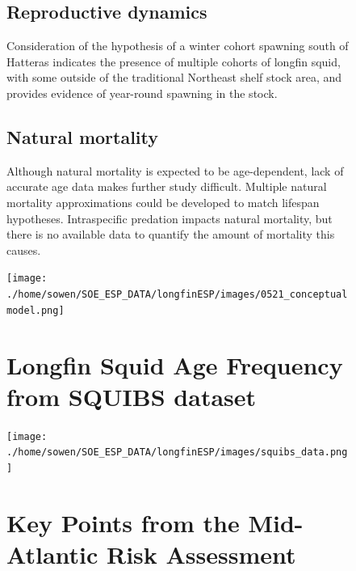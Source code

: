 \documentclass[
  8.5pt,
  letterpaper,
]{article}
\begin{document}
\begin{figure}
\begin{minipage}{0.57\linewidth}
\vspace{0.25cm}

\subsection{Reproductive dynamics}

Consideration of the hypothesis of a winter cohort spawning south of
Hatteras indicates the presence of multiple cohorts of longfin squid,
with some outside of the traditional Northeast shelf stock area, and
provides evidence of year-round spawning in the stock.

\vspace{0.25cm}

\subsection{Natural mortality}

Although natural mortality is expected to be age-dependent, lack of
accurate age data makes further study difficult. Multiple natural
mortality approximations could be developed to match lifespan
hypotheses. Intraspecific predation impacts natural mortality, but there
is no available data to quantify the amount of mortality this causes.

\vspace{1.0cm}

\texttt{[image: ./home/sowen/SOE\_ESP\_DATA/longfinESP/images/0521\_conceptual model.png]}

\end{minipage}%
%
\begin{minipage}{0.03\linewidth}

\hfill

\end{minipage}%
%
\begin{minipage}{0.40\linewidth}

\section{Longfin Squid Age Frequency from SQUIBS dataset}

\texttt{[image: ./home/sowen/SOE\_ESP\_DATA/longfinESP/images/squibs\_data.png]}

\vspace{1.0cm}

\section{Key Points from the Mid-Atlantic Risk Assessment}


\end{minipage}
\end{figure}
\end{document}
